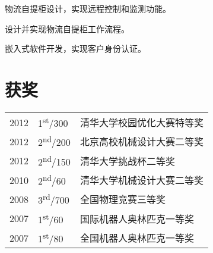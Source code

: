 \documentclass[]{deedy-resume-ch}
\begin{document}
\begin{minipage}[t]{0.66\textwidth}
\begin{tightemize}
\item 物流自提柜设计，实现远程控制和监测功能。
\item 设计并实现物流自提柜工作流程。
\item 嵌入式软件开发，实现客户身份认证。
\end{tightemize}

\sectionsep


\section{获奖}
\begin{tabular}{rll}
2012	 & 1\textsuperscript{st}/300  & 清华大学校园优化大赛特等奖\\
2012	 & 2\textsuperscript{nd}/200  & 北京高校机械设计大赛二等奖\\
2012	 & 2\textsuperscript{nd}/150  & 清华大学挑战杯二等奖\\
2010	 & 2\textsuperscript{nd}/60   & 清华大学机械设计大赛二等奖\\
2008	 & 3\textsuperscript{rd}/700  & 全国物理竞赛三等奖\\
2007	 & 1\textsuperscript{st}/60       & 国际机器人奥林匹克一等奖\\
2007 	 & 1\textsuperscript{st}/80 	  & 全国机器人奥林匹克一等奖\\
\end{tabular}
\sectionsep

\end{minipage}
\end{document}
